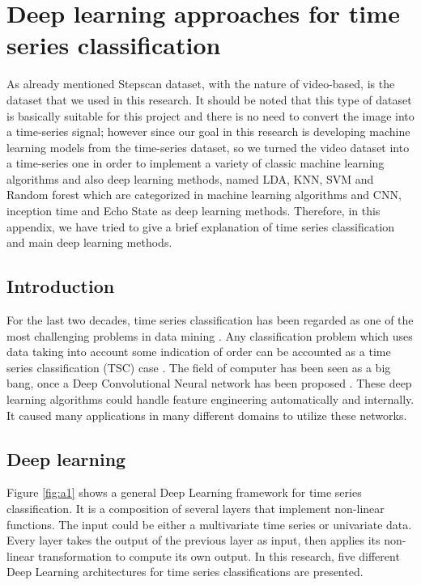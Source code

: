
\section{Deep learning approaches for time series classification}
\label{appendix:2}

As already mentioned Stepscan dataset, with the nature of video-based, is the dataset that we used in this research. It should be noted that this type of dataset is basically suitable for this project and there is no need to convert the image into a time-series signal; however since our goal in this research is developing machine learning models from the time-series dataset, so we turned the video dataset into a time-series one in order to implement a variety of classic machine learning algorithms and also deep learning methods, named LDA, KNN, SVM and Random forest which are categorized in machine learning algorithms and CNN, inception time and Echo State as deep learning methods. Therefore, in this appendix, we have tried to give a brief explanation of time series classification and main deep learning methods.


\subsection{Introduction}

For the last two decades, time series classification has been regarded as one of the most challenging problems in data mining \cite{Esling2012Time-seriesMining}. Any classification problem which uses data taking into account some indication of order can be accounted as a time series classification (TSC) case \cite{Gamboa2017DeepAnalysis}.  The field of computer has been seen as a big bang, once a Deep Convolutional Neural network has been proposed \cite{Krizhevsky2017ImageNetNetworks}. These deep learning algorithms could handle feature engineering automatically and internally. It caused many applications in many different domains to utilize these networks.  


\subsection{Deep learning}

Figure \ref{fig:a1} shows a general Deep Learning framework for time series classification. It is a composition of several layers that implement non-linear functions. The input could be either a multivariate time series or univariate data. Every layer takes the output of the previous layer as input, then applies its non-linear transformation to compute its own output.
In this research, five different Deep Learning architectures for time series classifications are presented. 



